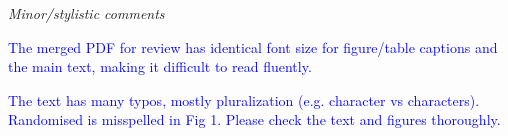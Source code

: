 \documentclass[12pt,letterpaper]{article}
\renewcommand{\subsection}[1]{%
\bigskip
\begin{center}
\begin{large}
\normalfont\itshape #1
\end{large}
\end{center}}
\begin{document}
\subsection{Minor/stylistic comments}

\textcolor{blue}{The merged PDF for review has identical font size for figure/table captions and the main text, making it difficult to read fluently.}

\textcolor{blue}{The text has many typos, mostly pluralization (e.g. character vs characters). Randomised is misspelled in Fig 1. Please check the text and figures thoroughly.}




\end{document}
